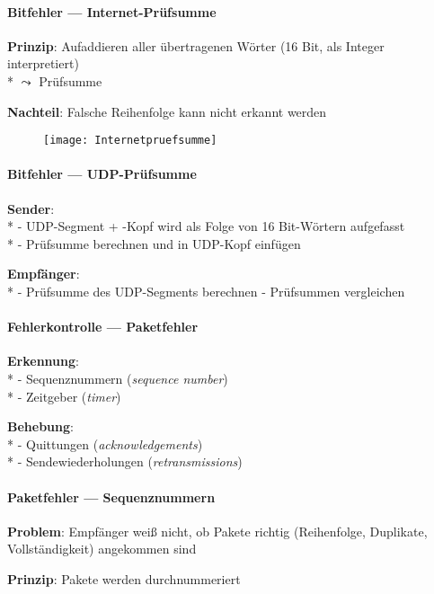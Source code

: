 \paragraph{Bitfehler --- Internet-Prüfsumme}
\begin{items}
  \item \textbf{Prinzip}: Aufaddieren aller übertragenen Wörter (16 Bit, als Integer interpretiert) \\* 
    \( \leadsto \) Prüfsumme
  \item \textbf{Nachteil}: Falsche Reihenfolge kann nicht erkannt werden
\end{items}
\begin{figure}[H]\centering\label{Internetpruefsumme}\texttt{[image: Internetpruefsumme]}\end{figure}

\paragraph{Bitfehler --- UDP-Prüfsumme}
\begin{items}
  \item \textbf{Sender}: \\*
    - UDP-Segment + -Kopf wird als Folge von 16 Bit-Wörtern aufgefasst \\*
    - Prüfsumme berechnen und in UDP-Kopf einfügen
  \item \textbf{Empfänger}: \\*
    - Prüfsumme des UDP-Segments berechnen
    - Prüfsummen vergleichen
\end{items}

\paragraph{Fehlerkontrolle --- Paketfehler}
\begin{items}
  \item \textbf{Erkennung}: \\*
    - Sequenznummern (\emph{sequence number}) \\*
    - Zeitgeber (\emph{timer})
  \item \textbf{Behebung}: \\*
    - Quittungen (\emph{acknowledgements}) \\*
    - Sendewiederholungen (\emph{retransmissions})
\end{items}

\paragraph{Paketfehler --- Sequenznummern}
\begin{items}
  \item \textbf{Problem}: Empfänger weiß nicht, ob Pakete richtig (Reihenfolge, Duplikate, Vollständigkeit) angekommen sind
  \item \textbf{Prinzip}: Pakete werden durchnummeriert
\end{items}

